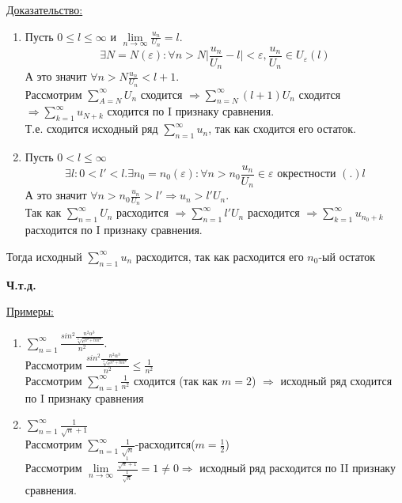\documentclass[12pt]{article}
\let\oldsum\sum
\let\oldlim\lim
\renewcommand{\sum}{\oldsum\limits}
\renewcommand{\lim}{\oldlim\limits}
\begin{document}
  \underline{Доказательство:}
  \begin{adjustwidth}{1.5em}{1.5em}
    \begin{enumerate}
      \item Пусть $0\leq l \leq \infty $ и $\lim_{n \to \infty} \frac{u_n}{U_n}=l. $\[\exists N=N(\varepsilon): \forall n>N
      \Big| \frac{u_n}{U_n}-l \Big| < \varepsilon, \frac{u_n}{U_n} \in U_\varepsilon (l)\]
      А это значит $\forall n > N \frac{u_n}{U_n}<l+1$.\\
      Рассмотрим $\sum_{A=N}^{\infty}U_n$ сходится $\Rightarrow \sum_{n=N}^{\infty}(l+1)U_n$ сходится $\Rightarrow \sum_{k=1}^{\infty} u_{N+k}$
      сходится по I признаку сравнения.\\
      Т.е. сходится исходный ряд $\sum_{n=1}^{\infty} u_n$, так как сходится его остаток.
      
      \item Пусть $0<l \leq \infty$
      \[\exists l: 0 < l' < l. \exists n_0=n_0(\varepsilon): \forall n>n_0 \frac{u_n}{U_n} \in \varepsilon \text{ окрестности } (.) l\]
      А это значит $\forall n>n_0 \frac{u_n}{U_n}> l' \Rightarrow u_n > l'U_n$.\\
      Так как $\sum_{n=1}^{\infty}U_n$ расходится $\Rightarrow \sum_{n=1}^{\infty} l'U_n$ расходится 
      $\Rightarrow \sum_{k=1}^{\infty} u_{n_0+k}$ расходится по I признаку сравнения.
    \end{enumerate}
    Тогда исходный $\sum_{n=1}^{\infty}u_n$ расходится, так как расходится его $n_0$-ый остаток
  \end{adjustwidth}
  
  \begin{center}
    \textbf{Ч.т.д.}
  \end{center}

  \underline{Примеры:}
  \begin{enumerate}
    \item $\sum_{n=1}^{\infty} \frac{sin^2 \frac{n^2 \alpha^3}{\sqrt[3]{e^{n^2+ln n^2}}}}{n^2}$.
    \\ Рассмотрим $\frac{sin^2 \frac{n^2 \alpha^3}{\sqrt[3]{e^{n^2+ln n^2}}}}{n^2} \leq \frac{1}{n^2}$\\
    Рассмотрим $\sum_{n=1}^{\infty} \frac{1}{n^2}$ сходится (так как $m=2$) $\Rightarrow$ исходный ряд сходится по I признаку сравнения

    \item $\sum_{n=1}^{\infty} \frac{1}{\sqrt{n}+1}$\\
    Рассмотрим $\sum_{n=1}^{\infty}\frac{1}{\sqrt{n}}$-расходится($m=\frac{1}{2}$)\\
    Рассмотрим $\lim_{n \to \infty} \frac{\frac{1}{\sqrt{n}+1}}{\frac{1}{\sqrt{n}}}=1\not=0 \Rightarrow$ исходный ряд расходится по II признаку сравнения.
  \end{enumerate}
\end{document}
